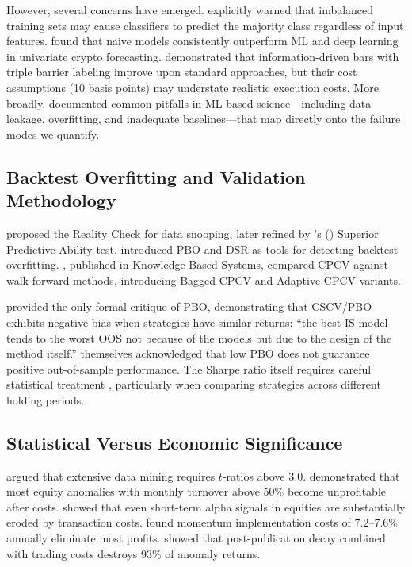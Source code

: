 \documentclass[preprint,12pt,authoryear]{elsarticle}
\begin{document}
However, several concerns have emerged. \citet{jaquart2021short} explicitly warned that imbalanced training sets may cause classifiers to predict the majority class regardless of input features. \citet{lahmiri2019cryptocurrency} found that naive models consistently outperform ML and deep learning in univariate crypto forecasting. \citet{gradzki2025algorithmic} demonstrated that information-driven bars with triple barrier labeling improve upon standard approaches, but their cost assumptions (10 basis points) may understate realistic execution costs. More broadly, \citet{zhu2023machine} documented common pitfalls in ML-based science---including data leakage, overfitting, and inadequate baselines---that map directly onto the failure modes we quantify.

\subsection{Backtest Overfitting and Validation Methodology}

\citet{white2000reality} proposed the Reality Check for data snooping, later refined by \citeauthor{hansen2005test}'s (\citeyear{hansen2005test}) Superior Predictive Ability test. \citet{bailey2014deflated,bailey2017probability} introduced PBO and DSR as tools for detecting backtest overfitting. \citet{arian2024backtest}, published in Knowledge-Based Systems, compared CPCV against walk-forward methods, introducing Bagged CPCV and Adaptive CPCV variants.

\citet{witzany2021bayesian} provided the only formal critique of PBO, demonstrating that CSCV/PBO exhibits negative bias when strategies have similar returns: ``the best IS model tends to the worst OOS not because of the models but due to the design of the method itself.'' \citet{bailey2017probability} themselves acknowledged that low PBO does not guarantee positive out-of-sample performance. The Sharpe ratio itself requires careful statistical treatment \citep{lo2002statistics}, particularly when comparing strategies across different holding periods.

\subsection{Statistical Versus Economic Significance}

\citet{harvey2016cross} argued that extensive data mining requires $t$-ratios above 3.0. \citet{novymarx2016taxonomy} demonstrated that most equity anomalies with monthly turnover above 50\% become unprofitable after costs. \citet{blitz2023beyond} showed that even short-term alpha signals in equities are substantially eroded by transaction costs. \citet{patton2020what} found momentum implementation costs of 7.2--7.6\% annually eliminate most profits. \citet{chen2023zeroing} showed that post-publication decay combined with trading costs destroys 93\% of anomaly returns.
\end{document}
